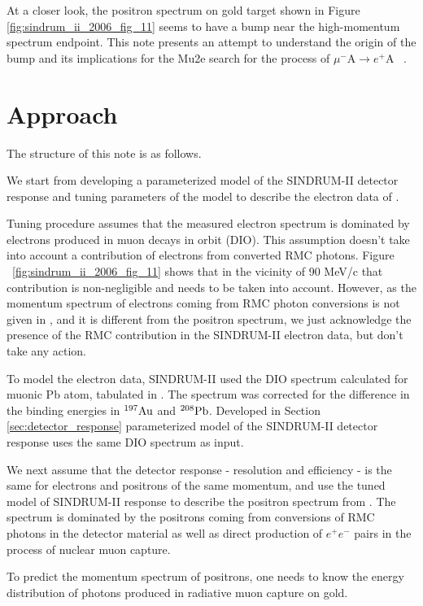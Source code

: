\documentclass[12pt]{article}
\newcommand {\mumepconv}[1][A] {%
  \def\ArgI{{#1}}%
  \mumepconvRelay
}
\newcommand \mumepconvRelay[1][A]  {\mbox{$\mu^- \textrm{\ArgI} \rightarrow e^+ \textrm{#1}$}}
\newcommand {\Pb}[1]     {\mbox{$\rm ^{#1}Pb$}}                 %
\newcommand {\Au}[1]     {\mbox{$\rm ^{#1}Au$}}                 %
\begin{document}
At a closer look, the positron spectrum on gold target
shown in Figure \ref{fig:sindrum_ii_2006_fig_11} seems to have a bump
near the high-momentum spectrum endpoint. 
This note presents an attempt to understand the origin of the bump
and its implications for the Mu2e search for the process of \mumepconv\ .

\newpage
\section { Approach}

The structure of this note is as follows.

We start from developing a parameterized model of the SINDRUM-II detector response
and tuning parameters of the model to describe the electron data of \cite{sindrum_ii:Bertl2006}. 

Tuning procedure assumes that the measured electron spectrum is dominated
by electrons produced in muon decays in orbit (DIO). This assumption
doesn't take into account a contribution of electrons from converted RMC photons. 
Figure ~\ref{fig:sindrum_ii_2006_fig_11} shows that in the vicinity of 90 MeV/c
that contribution is non-negligible and needs to be taken into account.
However, as the momentum spectrum of electrons coming from RMC photon
conversions is not given in \cite{sindrum_ii:Bertl2006}, and it is different
from the positron spectrum, we just acknowledge the presence of the RMC
contribution in the SINDRUM-II electron data, but don't take any action. 

To model the electron data, SINDRUM-II used the DIO spectrum calculated
for muonic Pb atom, tabulated in \cite{Watanabe_1993}. The spectrum was
corrected for the difference in the binding energies in \Au{197} and \Pb{208}.
Developed in Section \ref{sec:detector_response} parameterized model 
of the SINDRUM-II detector response uses the same DIO spectrum as input. 

We next assume that the detector response - resolution and efficiency - 
is the same for electrons and positrons of the same momentum,
and use the tuned model of SINDRUM-II response to describe the positron spectrum
from \cite{sindrum_ii:Bertl2006}. The spectrum is dominated by the positrons 
coming from conversions of RMC photons in the detector material as well as
direct production of $e^+e^-$ pairs in the process of nuclear muon capture.

To predict the momentum spectrum of positrons, one needs to know the
energy distribution of photons produced in radiative muon capture on gold.   
\end{document}
